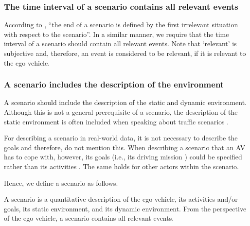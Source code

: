 \subsubsection{The time interval of a scenario contains all relevant events}
According to \textcite{geyer2014}, ``the end of a scenario is defined by the first irrelevant situation with respect to the scenario''. In a similar manner, we require that the time interval of a scenario should contain all relevant events. Note that `relevant' is subjective and, therefore, an event is considered to be relevant, if it is relevant to the ego vehicle.

\subsubsection{A scenario includes the description of the environment}
A scenario should include the description of the static and dynamic environment.
Although this is not a general prerequisite of a scenario, the description of the static environment is often included when speaking about traffic scenarios \cite{geyer2014, ulbrich2015, elrofai2016scenario, ebner2011identifying, schuldt2013effiziente, althoff2017CommonRoad}.

For describing a scenario in real-world data, it is not necessary to describe the goals and therefore, \textcite{elrofai2016scenario} do not mention this. When describing a scenario that an AV has to cope with, however, its goals (i.e., its driving mission \cite{geyer2014}) could be specified rather than its activities \cite{ulbrich2015}. The same holds for other actors within the scenario.

Hence, we define a scenario as follows.
\begin{definition}[Scenario]\label{def:scenario}
	A scenario is a quantitative description of the ego vehicle, its activities and/or goals, its static environment, and its dynamic environment. From the perspective of the ego vehicle, a scenario contains all relevant events.
\end{definition}

